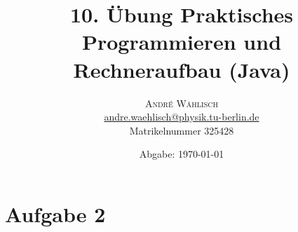 \documentclass{scrartcl}
\begin{document}
\title{10. Übung Praktisches Programmieren und Rechneraufbau (Java)}

\date{Abgabe: \today}

\author{
\large
\textsc{André Wählisch}\\[2mm]
\normalsize \href{mailto:andre.waehlisch@physik.tu-berlin.de}{andre.waehlisch@physik.tu-berlin.de} \\
\normalsize Matrikelnummer 325428 
}

\maketitle

\clearpage

\section*{Aufgabe 2}
\end{document}
